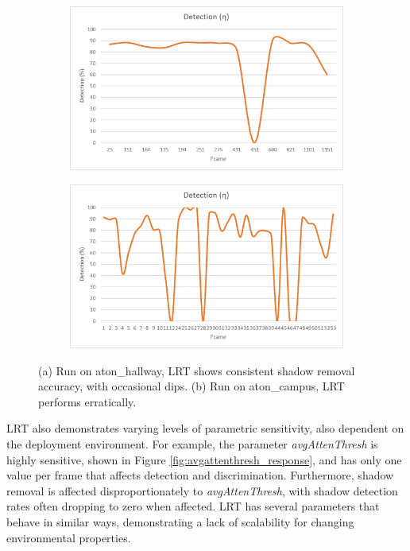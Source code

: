 \begin{figure}
\centering
\begin{subfigure}{.8\linewidth}
  \centering
  \includegraphics[width=1\linewidth]{figures/lrt_sensitivity_2.jpg}
  \caption{}
\end{subfigure}
\hfill
\begin{subfigure}{.8\linewidth}
  \centering
  \includegraphics[width=1\linewidth]{figures/lrt_sensitivity_1.jpg}
  \caption{}
\end{subfigure}
\caption{(a) Run on aton\_hallway, LRT shows consistent shadow removal accuracy, with occasional dips. (b) Run on aton\_campus, LRT performs erratically.}
\label{fig:lrt_sensitivity}
\end{figure}

LRT also demonstrates varying levels of parametric sensitivity, also dependent on the deployment environment. For example, the parameter \textit{avgAttenThresh} is highly sensitive, shown in Figure \ref{fig:avgattenthresh_response}, and has only one value per frame that affects detection and discrimination. Furthermore, shadow removal is affected disproportionately to \textit{avgAttenThresh}, with shadow detection rates often dropping to zero when affected. LRT has several parameters that behave in similar ways, demonstrating a lack of scalability for changing environmental properties.

